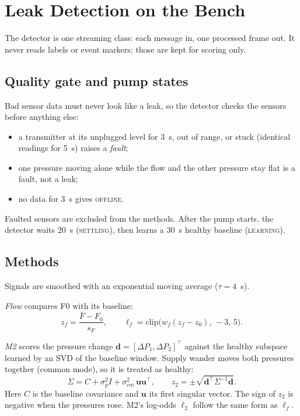\documentclass[conference]{IEEEtran}
\begin{document}
\section{Leak Detection on the Bench}
\label{sec:detector}
The detector is one streaming class: each message in, one processed frame out. It never reads
labels or event markers; those are kept for scoring only.

\subsection{Quality gate and pump states}
Bad sensor data must never look like a leak, so the detector checks the sensors before anything
else:
\begin{itemize}
\item a transmitter at its unplugged level for 3~s, out of range, or stuck (identical readings
  for 5~s) raises a \emph{fault};
\item one pressure moving alone while the flow and the other pressure stay flat is a fault, not
  a leak;
\item no data for 3~s gives \textsc{offline}.
\end{itemize}
Faulted sensors are excluded from the methods. After the pump starts, the detector waits 20~s
(\textsc{settling}), then learns a 30~s healthy baseline (\textsc{learning}).

\subsection{Methods}
Signals are smoothed with an exponential moving average ($\tau = 4$~s).

\emph{Flow} compares F0 with its baseline:
\begin{equation}
z_f = \frac{\bar F - F_0}{s_F},\qquad
\ell_f = \mathrm{clip}\big(w_f (z_f - z_0),\,-3,\,5\big).
\end{equation}

\emph{M2} scores the pressure change $\mathbf d = [\Delta P_1, \Delta P_2]^\top$ against the
healthy subspace learned by an SVD of the baseline window. Supply wander moves both pressures
together (common mode), so it is treated as healthy:
\begin{equation}
\Sigma = C + \sigma_p^2 I + \sigma_{cm}^2\,\mathbf u\mathbf u^\top,\qquad
z_2 = \pm\sqrt{\mathbf d^\top \Sigma^{-1}\mathbf d}.
\end{equation}
Here $C$ is the baseline covariance and $\mathbf u$ its first singular vector. The sign of $z_2$
is negative when the pressures rose. M2's log-odds $\ell_2$ follow the same form as $\ell_f$.
\end{document}
